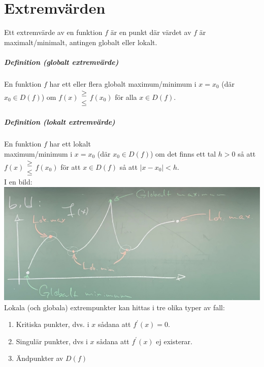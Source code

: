 \chapter{Extremvärden}
Ett extremvärde av en funktion $f$ är en punkt där värdet av $f$ är \\
maximalt/minimalt, antingen globalt eller lokalt.

\paragraph{Definition (globalt extremvärde)} En funktion $f$ har ett eller flera globalt maximum/minimum i $x=x_0$ (där $x_0\in D(f)$) om $f(x)\begin{matrix}\geq\\\leq\end{matrix}f(x_0)$ för alla $x\in D(f)$.

\paragraph{Definition (lokalt extremvärde)} En funktion $f$ har ett lokalt \\
maximum/minimum i $x=x_0$ (där $x_0\in D(f)$) om det finns ett tal $h>0$ så att $f(x)\begin{matrix}\geq\\\leq\end{matrix} f(x_0)$ för att $x\in D(f)$ så att $|x-x_0|<h$.\\
I en bild:\\
\includegraphics[scale=0.1]{lessons/lesson10/imgs/img04.jpg}\\
Lokala (och globala) extrempunkter kan hittas i tre olika typer av fall:
\begin{enumerate}
    \item Kritiska punkter, dvs. i $x$ sådana att $f^\prime(x)=0$.
    \item Singulär punkter, dvs i $x$ sådana att $f^\prime(x)$ ej existerar.
    \item Ändpunkter av $D(f)$
\end{enumerate}

